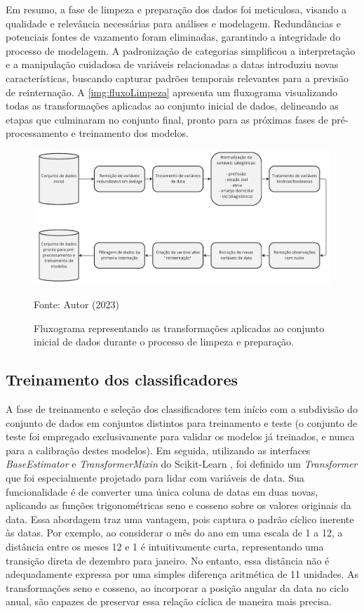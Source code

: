 Em resumo, a fase de limpeza e preparação dos dados foi meticulosa, visando a qualidade e relevância necessárias para análises e modelagem. Redundâncias e potenciais fontes de vazamento foram eliminadas, garantindo a integridade do processo de modelagem. A padronização de categorias simplificou a interpretação e a manipulação cuidadosa de variáveis relacionadas a datas introduziu novas características, buscando capturar padrões temporais relevantes para a previsão de reinternação. A \autoref{img:fluxoLimpeza} apresenta um fluxograma visualizando todas as transformações aplicadas ao conjunto inicial de dados, delineando as etapas que culminaram no conjunto final, pronto para as próximas fases de pré-processamento e treinamento dos modelos.

\begin{figure}[H]
	\centering
	\caption{\label{img:fluxoLimpeza}Fluxograma representando as transformações aplicadas ao conjunto inicial de dados durante o processo de limpeza e preparação.}
	\includegraphics[scale=0.7]{USPSC-img/fluxo-limpeza.pdf}
	\begin{center}
		Fonte: Autor (2023)
	\end{center}
\end{figure}

\subsection{Treinamento dos classificadores}

A fase de treinamento e seleção dos classificadores tem início com a subdivisão do conjunto de dados em conjuntos distintos para treinamento e teste (o conjunto de teste foi empregado exclusivamente para validar os modelos já treinados, e nunca para a calibração destes modelos). Em seguida, utilizando as interfaces \textit{BaseEstimator} e \textit{TransformerMixin} do Scikit-Learn \cite{Buitinck}, foi definido um \textit{Transformer} que foi especialmente projetado para lidar com variáveis de data. Sua funcionalidade é de converter uma única coluna de datas em duas novas, aplicando as funções trigonométricas seno e cosseno sobre os valores originais da data. Essa abordagem traz uma vantagem, pois captura o padrão cíclico inerente às datas. Por exemplo, ao considerar o mês do ano em uma escala de 1 a 12, a distância entre os meses 12 e 1 é intuitivamente curta, representando uma transição direta de dezembro para janeiro. No entanto, essa distância não é adequadamente expressa por uma simples diferença aritmética de 11 unidades. As transformações seno e cosseno, ao incorporar a posição angular da data no ciclo anual, são capazes de preservar essa relação cíclica de maneira mais precisa.

